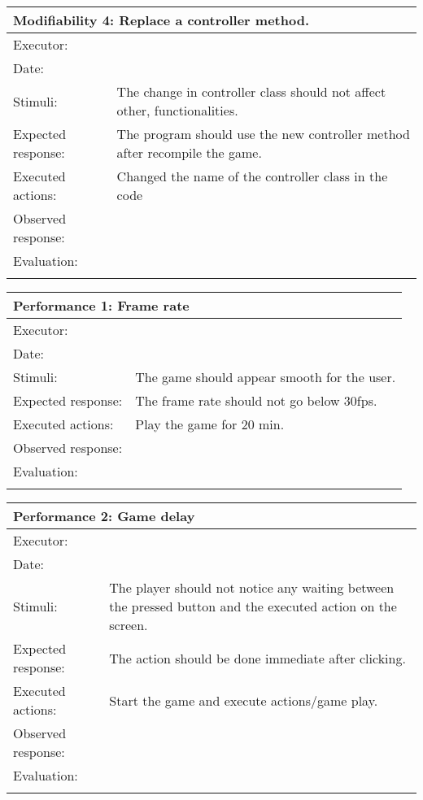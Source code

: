\begin{tabular}{|p{3.5cm}|p{7.5cm}|}
\hline
\multicolumn{2}{|l|}{Modifiability 4: Replace a controller method.}\\
\hline
Executor: 					& \\   
Date:    						& \\ 			
Stimuli:     				& The change in controller class should not affect other, functionalities.\\
Expected response:  & The program should use the new controller method after recompile the game.\\
Executed actions:   & Changed the name of the controller class in the code\\
Observed response:  & \\ 
Evaluation:    			& \\ 
\hline
\multicolumn{2}{l}{ }\\
\end{tabular}


\begin{tabular}{|p{3.5cm}|p{7.5cm}|}
\hline
\multicolumn{2}{|l|}{Performance 1: Frame rate}\\
\hline
Executor: 					& \\   
Date:    						& \\ 			
Stimuli:     				& The game should appear smooth for the user.\\
Expected response:  & The frame rate should not go below 30fps.\\
Executed actions:   & Play the game for 20 min.\\
Observed response:  & \\ 
Evaluation:    			& \\ 
\hline
\multicolumn{2}{l}{ }\\
\end{tabular}


\begin{tabular}{|p{3.5cm}|p{7.5cm}|}
\hline
\multicolumn{2}{|l|}{Performance 2: Game delay}\\
\hline
Executor: 					& \\   
Date:    						& \\ 			
Stimuli:     				& The player should not notice any waiting between the pressed button and the executed action on the screen.\\
Expected response:  & The action should be done immediate after clicking.\\
Executed actions:   & Start the game and execute actions/game play.\\
Observed response:  & \\ 
Evaluation:    			& \\ 
\hline
\multicolumn{2}{l}{ }\\
\end{tabular}


